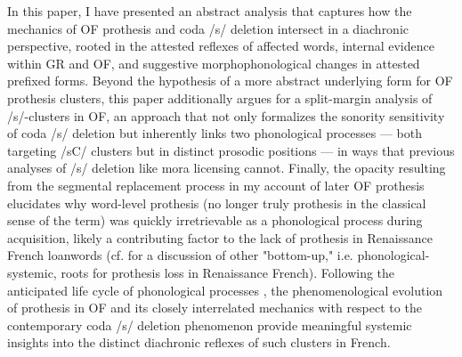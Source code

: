 \documentclass[output=paper,colorlinks,citecolor=brown,
]{langscibook}
\begin{document}
In this paper, I have presented an abstract analysis that captures how the mechanics of OF prothesis and coda /s/ deletion intersect in a diachronic perspective, rooted in the attested reflexes of affected words, internal evidence within GR and OF, and suggestive morphophonological changes in attested prefixed forms.  Beyond the hypothesis of a more abstract underlying form for OF prothesis clusters, this paper additionally argues for a split-margin analysis of /s/-clusters in OF, an approach that not only formalizes the sonority sensitivity of coda /s/ deletion but inherently links two phonological processes — both targeting /sC/ clusters but in distinct prosodic positions — in ways that previous analyses of /s/ deletion like mora licensing cannot.  Finally, the opacity resulting from the segmental replacement process in my account of later OF prothesis elucidates why word-level prothesis (no longer truly prothesis in the classical sense of the term) was quickly irretrievable as a phonological process during acquisition, likely a contributing factor to the lack of prothesis in Renaissance French loanwords (cf. \citet[123--126]{Sampson2010} for a discussion of other "bottom-up," i.e. phonological-systemic, roots for prothesis loss in Renaissance French).  Following the anticipated life cycle of phonological processes \citep{Bermúdez-Otero2015}, the phenomenological evolution of prothesis in OF and its closely interrelated mechanics with respect to the contemporary coda /s/ deletion phenomenon provide meaningful systemic insights into the distinct diachronic reflexes of such clusters in French. 
\printbibliography[heading=subbibliography,notkeyword=this]


\end{document}
